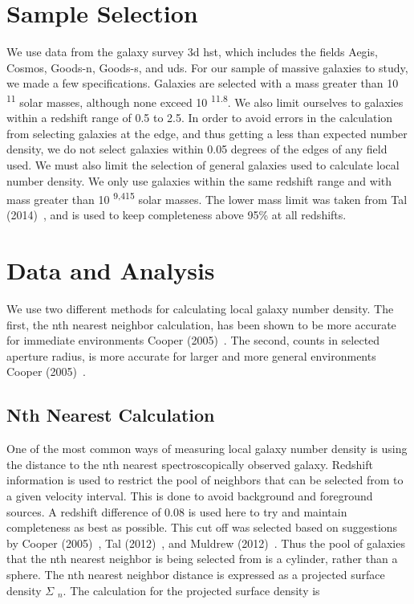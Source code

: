 \documentclass[apj]{emulateapj}
\begin{document}
\section{Sample Selection}

We use data from the galaxy survey 3d hst, which includes the fields Aegis, Cosmos, Goods-n, Goods-s, and uds. For our sample of massive galaxies to study, we made a few specifications. Galaxies are selected with a mass greater than 10 \textsuperscript{11} solar masses, although none exceed 10 \textsuperscript{11.8}. We also limit ourselves to galaxies within a redshift range of 0.5 to 2.5. In order to avoid errors in the calculation from selecting galaxies at the edge, and thus getting a less than expected number density, we do not select galaxies within 0.05 degrees of the edges of any field used.
We must also limit the selection of general galaxies used to calculate local number density. We only use galaxies within the same redshift range and with mass greater than 10 \textsuperscript{9,415} solar masses. The lower mass limit was taken from Tal (2014)~\cite{2014ApJ...789..164T}, and is used to keep completeness above 95\% at all redshifts.

\section{Data and Analysis}

We use two different methods for calculating local galaxy number density. The first, the nth nearest neighbor calculation, has been shown to be more accurate for immediate environments Cooper (2005)~\cite{2005ApJ...634..833C}. The second, counts in selected aperture radius, is more accurate for larger and more general environments Cooper (2005)~\cite{2005ApJ...634..833C}.

\subsection{Nth Nearest Calculation}

One of the most common ways of measuring local galaxy number density is using the distance to the nth nearest spectroscopically observed galaxy. Redshift information is used to restrict the pool of neighbors that can be selected from to a given velocity interval. This is done to avoid background and foreground sources. A redshift difference of 0.08 is used here to try and maintain completeness as best as possible. This cut off was selected based on suggestions by Cooper (2005)~\cite{2005ApJ...634..833C}, Tal (2012)~\cite{2012ApJ...751L...5T}, and Muldrew (2012)~\cite{2012MNRAS.419.2670M}. Thus the pool of galaxies that the nth nearest neighbor is being selected from is a cylinder, rather than a sphere. The nth nearest neighbor distance is expressed as a projected surface density $\Sigma$ $_{n}$. The calculation for the projected surface density is
\end{document}
